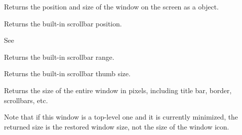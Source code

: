 

\label{wxwindowgetscreenrect}


Returns the position and size of the window on the screen as a 
 object.




\label{wxwindowgetscrollpos}


Returns the built-in scrollbar position.


See 


\label{wxwindowgetscrollrange}


Returns the built-in scrollbar range.




\label{wxwindowgetscrollthumb}


Returns the built-in scrollbar thumb size.




\label{wxwindowgetsize}



Returns the size of the entire window in pixels, including title bar, border,
scrollbars, etc.

Note that if this window is a top-level one and it is currently minimized, the
returned size is the restored window size, not the size of the window icon.


